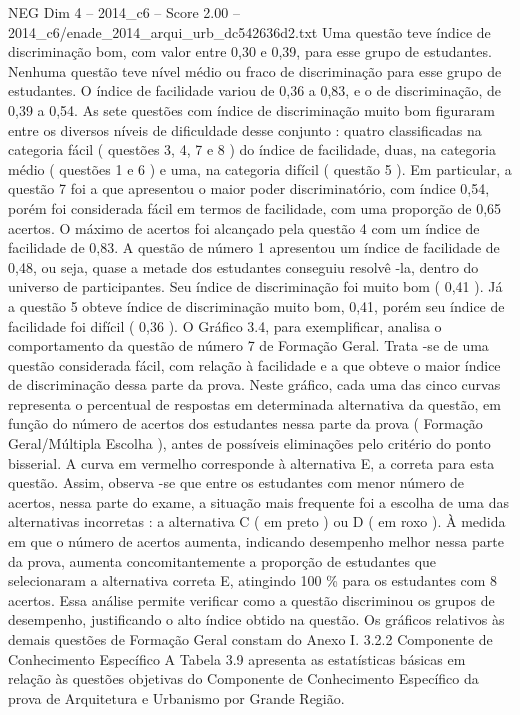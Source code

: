 \begin{textsample}{NEG Dim 4 – 2014\_c6 – Score 2.00 – 2014\_c6/enade\_2014\_arqui\_urb\_dc542636d2.txt}
Uma questão teve índice de discriminação bom, com valor entre 0,30 e 0,39, para esse grupo de estudantes.
Nenhuma questão teve nível médio ou fraco de discriminação para esse grupo de estudantes.
O índice de facilidade variou de 0,36 a 0,83, e o de discriminação, de 0,39 a 0,54.
As sete questões com índice de discriminação muito bom figuraram entre os diversos níveis de dificuldade desse conjunto : quatro classificadas na categoria fácil ( questões 3, 4, 7 e 8 ) do índice de facilidade, duas, na categoria médio ( questões 1 e 6 ) e uma, na categoria difícil ( questão 5 ).
Em particular, a questão 7 foi a que apresentou o maior poder discriminatório, com índice 0,54, porém foi considerada fácil em termos de facilidade, com uma proporção de 0,65 acertos.
O máximo de acertos foi alcançado pela questão 4 com um índice de facilidade de 0,83.
A questão de número 1 apresentou um índice de facilidade de 0,48, ou seja, quase a metade dos estudantes conseguiu resolvê -la, dentro do universo de participantes.
Seu índice de discriminação foi muito bom ( 0,41 ).
Já a questão 5 obteve índice de discriminação muito bom, 0,41, porém seu índice de facilidade foi difícil ( 0,36 ).
O Gráfico 3.4, para exemplificar, analisa o comportamento da questão de número 7 de Formação Geral.
Trata -se de uma questão considerada fácil, com relação à facilidade e a que obteve o maior índice de discriminação dessa parte da prova.
Neste gráfico, cada uma das cinco curvas representa o percentual de respostas em determinada alternativa da questão, em função do número de acertos dos estudantes nessa parte da prova ( Formação Geral/Múltipla Escolha ), antes de possíveis eliminações pelo critério do ponto bisserial.
A curva em vermelho corresponde à alternativa E, a correta para esta questão.
Assim, observa -se que entre os estudantes com menor número de acertos, nessa parte do exame, a situação mais frequente foi a escolha de uma das alternativas incorretas : a alternativa C ( em preto ) ou D ( em roxo ).
À medida em que o número de acertos aumenta, indicando desempenho melhor nessa parte da prova, aumenta concomitantemente a proporção de estudantes que selecionaram a alternativa correta E, atingindo 100 \% para os estudantes com 8 acertos.
Essa análise permite verificar como a questão discriminou os grupos de desempenho, justificando o alto índice obtido na questão.
Os gráficos relativos às demais questões de Formação Geral constam do Anexo I. 3.2.2 Componente de Conhecimento Específico A Tabela 3.9 apresenta as estatísticas básicas em relação às questões objetivas do Componente de Conhecimento Específico da prova de Arquitetura e Urbanismo por Grande Região.

\end{textsample}
